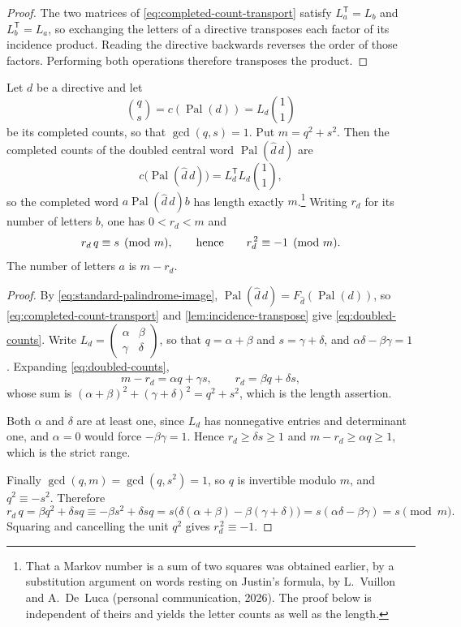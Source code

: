 \begin{proof}
The two matrices of \eqref{eq:completed-count-transport} satisfy
$L_a^{\mathsf T}=L_b$ and $L_b^{\mathsf T}=L_a$, so exchanging the
letters of a directive transposes each factor of its incidence product.
Reading the directive backwards reverses the order of those factors.
Performing both operations therefore transposes the product.
\end{proof}

\begin{proposition}
\label{prop:doubled-directive-counts}
Let $d$ be a directive and let
$$
 \binom qs=c(\operatorname{Pal}(d))=L_d\binom11
$$
be its completed counts, so that $\gcd(q,s)=1$. Put
$m=q^2+s^2$. Then the completed counts of the doubled central word
$\operatorname{Pal}(\widehat d\,d)$ are
\begin{equation}\label{eq:doubled-counts}
 c\bigl(\operatorname{Pal}(\widehat d\,d)\bigr)
 =L_d^{\mathsf T}L_d\binom11 ,
\end{equation}
so the completed word $a\operatorname{Pal}(\widehat d\,d)b$ has length
exactly $m$.\footnote{That a Markov number is a sum of two squares was
obtained earlier, by a substitution argument on words resting on Justin's
formula, by L.~Vuillon and A.~De~Luca (personal communication, 2026). The
proof below is independent of theirs and yields the letter counts as well as
the length.} Writing $r_d$ for its number of letters $b$, one has
$0<r_d<m$ and
\begin{equation}\label{eq:doubled-root}
 r_d\,q\equiv s \pmod m,
 \qquad\hbox{hence}\qquad r_d^{\,2}\equiv-1\pmod m .
\end{equation}
The number of letters $a$ is $m-r_d$.
\end{proposition}

\begin{proof}
By \eqref{eq:standard-palindrome-image},
$\operatorname{Pal}(\widehat d\,d)=F_{\widehat d}(\operatorname{Pal}(d))$,
so \eqref{eq:completed-count-transport} and
\cref{lem:incidence-transpose} give \eqref{eq:doubled-counts}. Write
$L_d=\left(\begin{smallmatrix}\alpha&\beta\\\gamma&\delta\end{smallmatrix}\right)$,
so that $q=\alpha+\beta$ and $s=\gamma+\delta$, and
$\alpha\delta-\beta\gamma=1$. Expanding \eqref{eq:doubled-counts},
$$
 m-r_d=\alpha q+\gamma s,\qquad r_d=\beta q+\delta s,
$$
whose sum is $(\alpha+\beta)^2+(\gamma+\delta)^2=q^2+s^2$, which is the
length assertion.

Both $\alpha$ and $\delta$ are at least one, since $L_d$ has nonnegative
entries and determinant one, and $\alpha=0$ would force
$-\beta\gamma=1$. Hence $r_d\geqslant\delta s\geqslant1$ and
$m-r_d\geqslant\alpha q\geqslant1$, which is the strict range.

Finally $\gcd(q,m)=\gcd(q,s^2)=1$, so $q$ is invertible modulo $m$, and
$q^2\equiv-s^2$. Therefore
$$
 r_d\,q=\beta q^2+\delta sq
 \equiv-\beta s^2+\delta sq
 =s\bigl(\delta(\alpha+\beta)-\beta(\gamma+\delta)\bigr)
 =s(\alpha\delta-\beta\gamma)=s \pmod m .
$$
Squaring and cancelling the unit $q^2$ gives $r_d^{\,2}\equiv-1$.
\end{proof}


